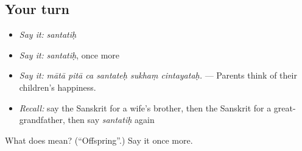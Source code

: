 \subsection*{Your turn}
\begin{itemize}
\raggedright
  \item \emph{Say it:} \emph{santatiḥ}
  \item \emph{Say it:} \emph{santatiḥ}, once more
  \item \emph{Say it:} \emph{mātā pitā ca santateḥ sukhaṃ cintayataḥ.} — Parents think of their children's happiness.
  \item \emph{Recall:} say the Sanskrit for a wife's brother, then the Sanskrit for a great-grandfather, then say \emph{santatiḥ} again
\end{itemize}

\begin{tcolorbox}[breakable,colback=teal!4,colframe=teal!35!black,title={Before you move on}]
What does  mean? (\textquotedblleft{}Offspring\textquotedblright{}.) Say it once more.
\end{tcolorbox}
